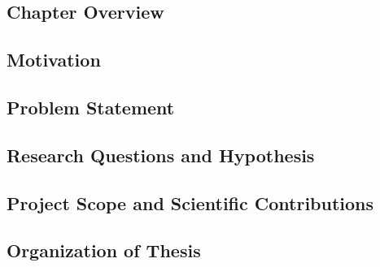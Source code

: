 \subsection{Chapter Overview}

\subsection{Motivation}

\subsection{Problem Statement}

\subsection{Research Questions and Hypothesis}

\subsection{Project Scope and Scientific Contributions}

\subsection{Organization of Thesis}